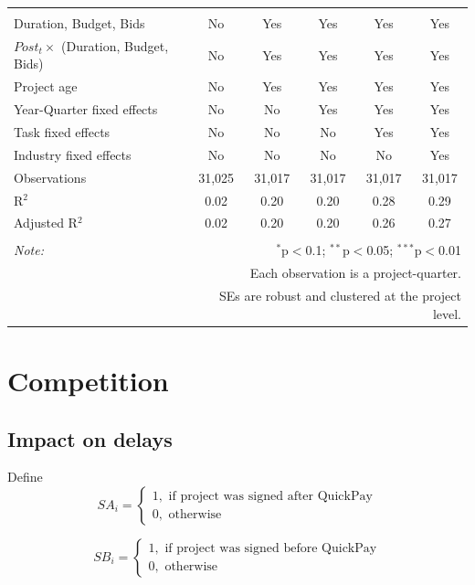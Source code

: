 \documentclass[
]{article}
\begin{document}
\begin{table}[H]
\begin{tabular}{@{\extracolsep{-2pt}}lccccc}
\hline \\[-1.8ex] 
Duration, Budget, Bids & No & Yes & Yes & Yes & Yes \\ 
$Post_t \times $  (Duration, Budget, Bids) & No & Yes & Yes & Yes & Yes \\ 
Project age & No & Yes & Yes & Yes & Yes \\ 
Year-Quarter fixed effects & No & No & Yes & Yes & Yes \\ 
Task fixed effects & No & No & No & Yes & Yes \\ 
Industry fixed effects & No & No & No & No & Yes \\ 
Observations & 31,025 & 31,017 & 31,017 & 31,017 & 31,017 \\ 
R$^{2}$ & 0.02 & 0.20 & 0.20 & 0.28 & 0.29 \\ 
Adjusted R$^{2}$ & 0.02 & 0.20 & 0.20 & 0.26 & 0.27 \\ 
\hline 
\hline \\[-1.8ex] 
\textit{Note:}  & \multicolumn{5}{r}{$^{*}$p$<$0.1; $^{**}$p$<$0.05; $^{***}$p$<$0.01} \\ 
 & \multicolumn{5}{r}{Each observation is a project-quarter.} \\ 
 & \multicolumn{5}{r}{SEs are robust and clustered at the project level.} \\ 
\end{tabular} 
\end{table}

\hypertarget{competition}{%
\section{Competition}\label{competition}}

\hypertarget{impact-on-delays}{%
\subsection{Impact on delays}\label{impact-on-delays}}

Define
\[ SA_i = \begin{cases} 1, \text{ if project was signed after QuickPay}\\
0, \text{ otherwise} \end{cases}\]

\[ SB_i = \begin{cases} 1, \text{ if project was signed before QuickPay}\\
0, \text{ otherwise} \end{cases}\]
\end{document}
